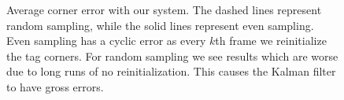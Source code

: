 \documentclass[letterpaper,10pt,conference]{IEEEtran}
\begin{document}
\begin{figure}
\centering
{}

\caption{Average corner error with our system.  The dashed lines represent random sampling, while the solid lines represent even sampling.  Even sampling has a cyclic error as every $k$th frame we reinitialize the tag corners.  For random sampling we see results which are worse due to long runs of no reinitialization.  This causes the Kalman filter to have gross errors.}
\label{fig:error_plot}
\end{figure}
\end{document}
